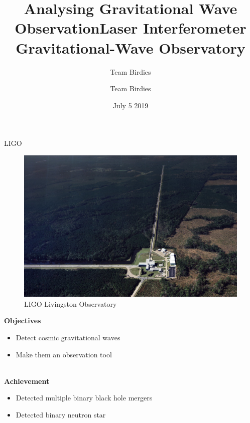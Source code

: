 \documentclass[11pt]{beamer}
\title{Analysing Gravitational Wave Observation}
\author{Team Birdies}
\author{Team Birdies}
\date{July 5 2019}
\begin{document}

\maketitle



\begin{frame}{LIGO}
\title{Laser Interferometer Gravitational-Wave Observatory}


\begin{figure}[h!]
\centering
\includegraphics[scale=0.2]{ligo.jpg}
\caption{LIGO Livingston Observatory}
\label{fig:ligo livingston observatory}
\end{figure}

\textbf{Objectives}
\begin{itemize}
    \item Detect cosmic gravitational waves
    \item Make them an observation tool
\end{itemize}
\\
\textbf{Achievement}
\begin{itemize}
    \item Detected multiple binary black hole mergers
    \item Detected binary neutron star
\end{itemize}
\end{frame}
\end{document}
